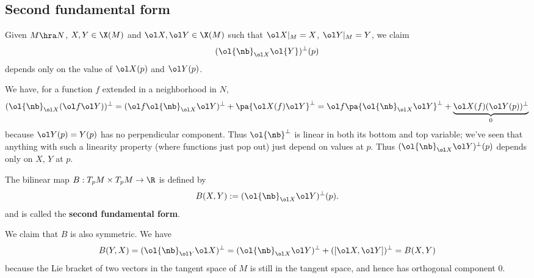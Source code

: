 \subsection{Second fundamental form}
Given $M\hra N$, $X,Y\in \X(M)$ and $\ol X,\ol Y\in \X(M)$ such that $\ol X|_M=X$, $\ol Y|_M=Y$, we claim 
\[
(\ol{\nb}_{\ol X} \ol{Y})^{\perp}(p)
\]
depends only on the value of $\ol X(p)$ and $\ol Y(p)$. %


We have, for a function $f$ extended in a neighborhood in $N$, 
\[
(\ol{\nb}_{\ol X} (\ol f \ol Y))^{\perp}=(\ol f\ol{\nb}_{\ol X}\ol Y)^{\perp}
+\pa{\ol X(f)\ol Y}^{\perp}
=\ol f\pa{\ol{\nb}_{\ol X}\ol Y}^{\perp} + \underbrace{\ol X(f)(\ol Y(p))^{\perp}}_0
\]
because $\ol Y(p)=Y(p)$ has no perpendicular component. 
Thus $\ol{\nb}^{\perp}$ is linear in both its bottom and top variable; we've seen that anything with such a linearity property (where functions just pop out) just depend on values at $p$. Thus $(\ol{\nb}_{\ol X}\ol Y)^{\perp}(p)$ depends only on $X$, $Y$ at $p$.
\begin{df}
The bilinear map $B:T_pM\times T_pM\to \R$ is defined by
\[
B(X,Y):=(\ol{\nb}_{\ol X}\ol Y)^{\perp}(p).
\]
and is called the \textbf{second fundamental form}.
\end{df}

We claim that $B$ is also symmetric. We have
\[
B(Y,X)=(\ol{\nb}_{\ol Y} \ol X)^{\perp}
=(\ol{\nb}_{\ol X}\ol Y)^{\perp}+([\ol X,\ol Y])^{\perp}=B(X,Y)
\]
because the Lie bracket of two vectors in the tangent space of $M$ is still in the tangent space, and hence has orthogonal component 0.

